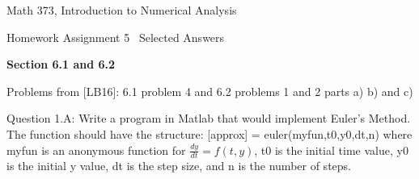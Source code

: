 \documentclass{article}
\renewcommand{\cite}[1]{[#1]}
\def\ds{\displaystyle}
\begin{document}

\large

{\Large Math 373, Introduction to Numerical Analysis}


{\Large Homework Assignment 5}  \ {\Large \color{teal}Selected Answers}




{\bf Section 6.1 and 6.2} \par \medskip \noindent
Problems from \cite{LB16}: 6.1 problem 4 and 6.2 problems 1 and 2 parts a) b) and c)   
\par \medskip \noindent
%
Question 1.A: Write a program in Matlab that would implement Euler's Method. The function should have the structure: [approx] = euler(myfun,t0,y0,dt,n) where myfun is an anonymous function for $\ds \frac {dy}{dt}=f(t,y)$, t0 is the initial time value, y0 is the initial y value, dt is the step size, and n is the number of steps.   
\end{document}
